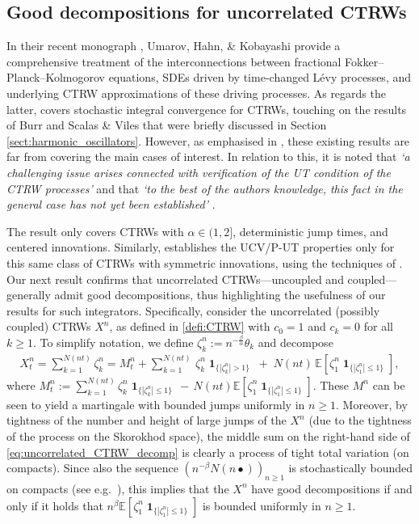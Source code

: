 \documentclass[11pt]{article}
\theoremstyle{definition}\newtheorem{example}[theorem]{Example}
\theoremstyle{definition}\newtheorem{counterexample}[theorem]{Counterexample}
\theoremstyle{definition}\newtheorem{remark}[theorem]{Remark}
\theoremstyle{definition}\newtheorem{defi}[theorem]{Definition}
\numberwithin{equation}{section}
\newcommand{\E}{\mathbb{E}}											%
\newcommand{\ind}{\operatorname{\mathbf{1}}}							%
\renewcommand{\|}{\; : \, \;}											%
\begin{document}
\subsection{Good decompositions for uncorrelated CTRWs}\label{sect:GD_CTRW}

In their recent monograph \cite{hahn}, Umarov, Hahn, \& Kobayashi provide a comprehensive treatment of the interconnections between fractional Fokker--Planck--Kolmogorov equations, SDEs driven by time-changed L\'evy processes, and underlying CTRW approximations of these driving processes. As regards the latter, \cite[Ch.~6]{hahn} covers stochastic integral convergence for CTRWs, touching on the results of Burr \cite{Burr} and Scalas \& Viles \cite{scalas} that were briefly discussed in Section \ref{sect:harmonic_oscillators}. However, as emphasised in \cite[Rmk.~6.4]{hahn}, these existing results are far from covering the main cases of interest. In relation to this, it is noted that \emph{`a challenging issue arises connected with verification of the UT condition of the CTRW processes'} and that \emph{`to the best of the authors knowledge, this fact in the general case has not yet been established'} \cite[p.~103]{hahn}.


The result \cite[Thm.~2]{Burr} only covers CTRWs with $\alpha\in (1,2]$, deterministic jump times, and centered innovations. Similarly, \cite[Lem.~4.11]{scalas} establishes the UCV/P-UT properties only for this same class of CTRWs with symmetric innovations, using the techniques of \cite{Burr}. Our next result confirms that uncorrelated CTRWs---uncoupled and coupled---generally admit good decompositions, thus highlighting the usefulness of our results for such integrators. Specifically, consider the uncorrelated (possibly coupled) CTRWs $X^n$, as defined in \eqref{defi:CTRW} with $c_0=1$ and $c_k=0$ for all $k\ge 1$. To simplify notation, we define $\zeta^n_k:= n^{-\frac\beta\alpha} \theta_k$ and decompose
\begin{align} X^n_t  =  \sum_{k=1}^{N(nt)} \zeta^n_k =  M^n_t  + \sum_{k=1}^{N(nt)} \,  \zeta^n_k \ind_{\{ |\zeta^n_k|>1\}} \; + \; N(nt) \, \E[ \zeta^n_1\ind_{\{ |\zeta^n_1 |\le 1\}} ], \label{eq:uncorrelated_CTRW_decomp}
\end{align}
where $M^n_t:= \sum_{k=1}^{N(nt)} \zeta^n_k \ind_{\{|\zeta^n_k|\le 1 \}} \, - \, N(nt) \E[\zeta^n_1 \ind_{\{|\zeta^n_1|\le 1 \}}]$. These $M^n$ can be seen to yield a martingale with bounded jumps uniformly in $n\geq1$. Moreover, by tightness of the number and height of large jumps of the $X^n$ (due to the tightness of the process on the Skorokhod space), the middle sum on the right-hand side of \eqref{eq:uncorrelated_CTRW_decomp} is clearly a process of tight total variation (on compacts). Since also the sequence $(n^{-\beta}N(n\bullet))_{n\ge 1}$ is stochastically bounded on compacts (see e.g.~\cite[Thm.~3.2]{meerschaert}), this implies that the $X^n$ have good decompositions if and only if it holds that $  n^\beta \E[ \zeta^n_1\ind_{\{ |\zeta^n_1 |\le 1\}}] $ is bounded uniformly in $n\geq1$. 
\end{document}
